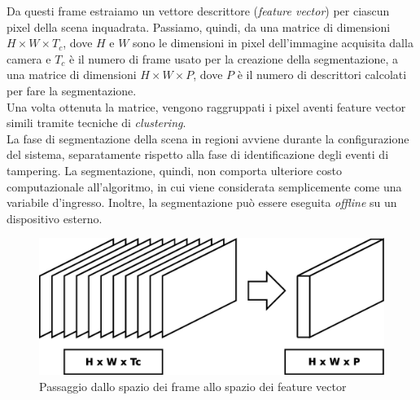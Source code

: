 Da questi frame estraiamo un vettore descrittore (\textit{feature vector}) per ciascun pixel della scena inquadrata.
Passiamo, quindi, da una matrice di dimensioni $H\times W \times T_{c}$, dove $H$ e $W$ sono le dimensioni in pixel dell'immagine acquisita dalla camera e $T_{c}$ \`e il numero di frame usato per la creazione della segmentazione, a una matrice di dimensioni $H\times W \times P$, dove $P$ \`e il numero di descrittori calcolati per fare la segmentazione.\\
Una volta ottenuta la matrice, vengono raggruppati i pixel aventi feature vector simili tramite tecniche di \textit{clustering}.\\
La fase di segmentazione della scena in regioni avviene durante la configurazione del sistema, separatamente rispetto alla fase di identificazione degli eventi di tampering.
La segmentazione, quindi, non comporta ulteriore costo computazionale all'algoritmo, in cui viene considerata semplicemente come una variabile d'ingresso.
Inoltre, la segmentazione pu\`o essere eseguita \textit{offline} su un dispositivo esterno.
\begin{figure}
	\centering
	\includegraphics[width=0.7\linewidth]{diagrammi/FeatureVector}
	\caption{Passaggio dallo spazio dei frame allo spazio dei feature vector}
	\label{fig:FeatureVector}
\end{figure}

